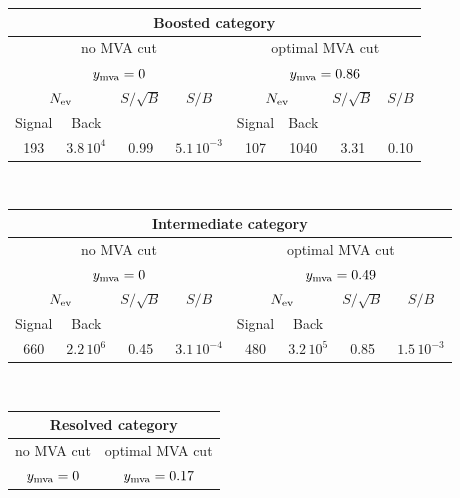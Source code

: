 \begin{table}[t]
  \centering
  \begin{tabular}{c|c|c|c||c|c|c|c}
    \hline
    \multicolumn{8}{c}{Boosted category}\\
    \hline
    \hline
    \multicolumn{4}{c||}{no MVA cut} & \multicolumn{4}{c}{optimal MVA cut}\\
    \multicolumn{4}{c||}{$y_{\rm mva}=0$} & \multicolumn{4}{c}{$y_{\rm mva}=0.86$}\\
    \hline
    \multicolumn{2}{c|}{$N_{\rm ev}$} &  $S/\sqrt{B}$  & $S/B$
    & \multicolumn{2}{c|}{$N_{\rm ev}$} &  $S/\sqrt{B}$  & $S/B$\\
        Signal & Back   &     &   &  Signal & Back   &     &    \\
    \hline
      193   &  $3.8\,10^4$    &  0.99    &  $5.1\,10^{-3}$  & 107 & 1040 & 3.31  & 0.10\\
        \hline
  \end{tabular}
   $\,$\\
  \vspace{0.4cm}
  \noindent
  \begin{tabular}{c|c|c|c||c|c|c|c}
    \hline
    \multicolumn{8}{c}{Intermediate category}\\
    \hline
    \hline
    \multicolumn{4}{c||}{no MVA cut} & \multicolumn{4}{c}{optimal MVA cut}\\
    \multicolumn{4}{c||}{$y_{\rm mva}=0$} & \multicolumn{4}{c}{$y_{\rm mva}=0.49$}\\
    \hline
    \multicolumn{2}{c|}{$N_{\rm ev}$} &  $S/\sqrt{B}$  & $S/B$
    & \multicolumn{2}{c|}{$N_{\rm ev}$} &  $S/\sqrt{B}$  & $S/B$\\
        Signal & Back   &     &   &  Signal & Back   &     &    \\
    \hline
      660   &   $2.2\,10^6$   &   0.45   &  $3.1\,10^{-4}$ & 480  & $3.2\,10^5$ & 0.85  & $1.5\,10^{-3}$ \\
        \hline
  \end{tabular}
    $\,$\\
  \vspace{0.4cm}
  \noindent
  \begin{tabular}{c|c|c|c||c|c|c|c}
    \hline
    \multicolumn{8}{c}{Resolved category}\\
    \hline
    \hline
    \multicolumn{4}{c||}{no MVA cut} & \multicolumn{4}{c}{optimal MVA cut}\\
    \multicolumn{4}{c||}{$y_{\rm mva}=0$} & \multicolumn{4}{c}{$y_{\rm mva}=0.17$}\\

\end{tabular}
\end{table}

